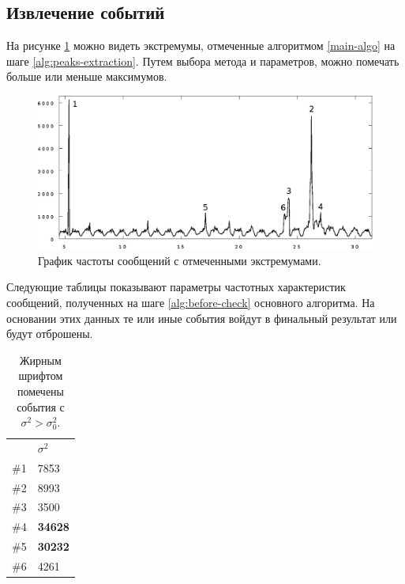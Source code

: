\documentclass[12pt, a4paper]{article}
\newcommand\todo[1]{\marginpar{\textcolor{red}{#1}}}
\begin{document}
  \subsection{Извлечение событий}
  
	На рисунке \ref{fig:all-freq-labeled} можно видеть экстремумы, отмеченные алгоритмом \ref{main-algo} на шаге \ref{alg:peaks-extraction}. Путем выбора метода и параметров, можно помечать больше или меньше максимумов. 

	 \begin{figure}[H]
	  \centering
	  \label{fig:all-freq-labeled}
	  \includegraphics[width=13cm]{all-freq-labeled.eps}
	  \caption{График частоты сообщений с отмеченными экстремумами.}
	  \end{figure}
	  
	Следующие таблицы показывают параметры частотных характеристик сообщений, полученных на шаге \ref{alg:before-check} основного алгоритма. На основании этих данных те или иные события войдут в финальный результат или будут отброшены.
	
	\begin{table}[H]
	\centering
	\begin{tabular}{l | l}
	& $\sigma^2$ \\ 
	\#1 & 7853 \\ 
	\#2 & 8993 \\ 
	\#3 & 3500 \\ 
	\#4 & \textbf{34628} \\ 
	\#5 & \textbf{30232} \\ 
	\#6 & 4261 \\ 
	\end{tabular}
	\caption{Жирным шрифтом помечены события с $\sigma^2>\sigma_0^2$.}
	\end{table}
	
\todo{triangle table}	
	
\end{document}
